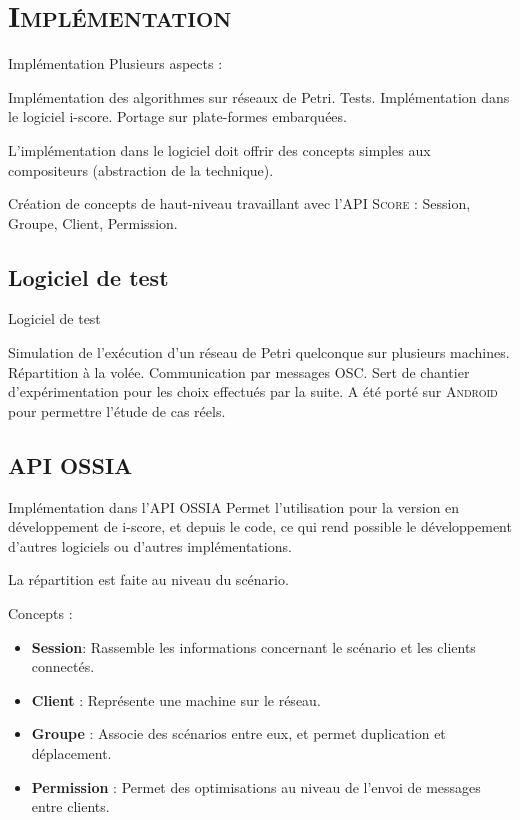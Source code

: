 \section{\scshape Implémentation}
\begin{frame}{Implémentation}
	Plusieurs aspects : 
	
	\begin{itemize}
		\itemar Implémentation des algorithmes sur réseaux de Petri.
		\itemar Tests.
		\itemar Implémentation dans le logiciel i-score.
		\itemar Portage sur plate-formes embarquées.
	\end{itemize}
	
	L'implémentation dans le logiciel doit offrir des concepts simples aux compositeurs (abstraction de la technique).
	
	\begin{itemize}
		\itemar Création de concepts de haut-niveau travaillant avec l'\textsc{API Score} : Session, Groupe, Client, Permission.
	\end{itemize}
\end{frame}

\subsection{Logiciel de test}
\begin{frame}{Logiciel de test}
	\begin{itemize}
		\itemar Simulation de l'exécution d'un réseau de Petri quelconque sur plusieurs machines.
		\itemar Répartition à la volée.
		\itemar Communication par messages \textsc{OSC}.
		\itemar Sert de chantier d'expérimentation pour les choix effectués par la suite.
		\itemar A été porté sur \textsc{Android} pour permettre l'étude de cas réels.
	\end{itemize}
\end{frame}

\subsection{API OSSIA}
\begin{frame}{Implémentation dans l'API OSSIA}
	Permet l'utilisation pour la version en développement de i-score, et depuis le code, ce qui rend possible le développement d'autres logiciels ou d'autres implémentations.
	
	La répartition est faite au niveau du scénario.
	
	Concepts : 
	\begin{itemize}
		\item \textbf{Session}: Rassemble les informations concernant le scénario et les clients connectés. 
		\item \textbf{Client} :  Représente une machine sur le réseau.
		\item \textbf{Groupe} :  Associe des scénarios entre eux, et permet duplication et déplacement.
		\item \textbf{Permission} :  
		Permet des optimisations au niveau de l'envoi de messages entre clients.
		
	\end{itemize}
\end{frame}

